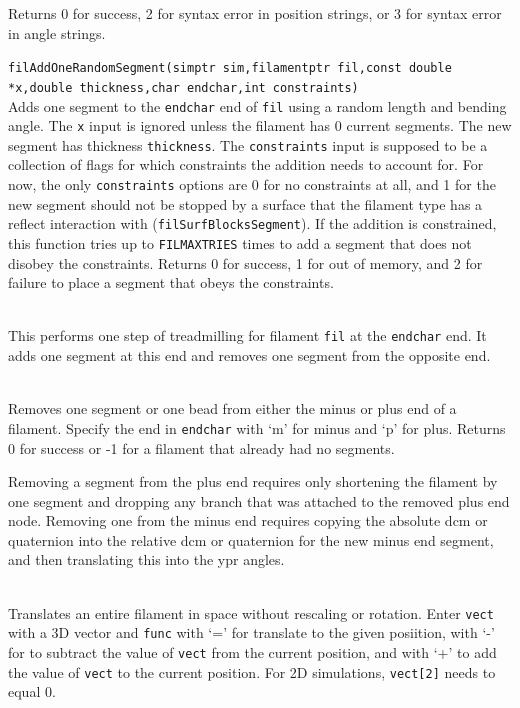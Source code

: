\documentclass {scrbook}
\newcommand {\ttt} {\texttt}
\begin{document}
\begin{description}
Returns 0 for success, 2 for syntax error in position strings, or 3 for syntax error in angle strings.

\item[\ttt{int}]
\ttt{filAddOneRandomSegment(simptr sim,filamentptr fil,const double *x,double thickness,char endchar,int constraints)}
\hfill \\
Adds one segment to the \ttt{endchar} end of \ttt{fil} using a random length and bending angle. The \ttt{x} input is ignored unless the filament has 0 current segments. The new segment has thickness \ttt{thickness}. The \ttt{constraints} input is supposed to be a collection of flags for which constraints the addition needs to account for. For now, the only \ttt{constraints} options are 0 for no constraints at all, and 1 for the new segment should not be stopped by a surface that the filament type has a reflect interaction with (\ttt{filSurfBlocksSegment}). If the addition is constrained, this function tries up to \ttt{FILMAXTRIES} times to add a segment that does not disobey the constraints. Returns 0 for success, 1 for out of memory, and 2 for failure to place a segment that obeys the constraints.

\item[\ttt{void filTreadmill(simptr sim, filamentptr fil, char endchar)}]
\hfill \\
This performs one step of treadmilling for filament \ttt{fil} at the \ttt{endchar} end. It adds one segment at this end and removes one segment from the opposite end.

\item[\ttt{int filRemoveSegment(filamentptr fil, char endchar)}]
\hfill \\
Removes one segment or one bead from either the minus or plus end of a filament. Specify the end in \ttt{endchar} with `m' for minus and `p' for plus. Returns 0 for success or -1 for a filament that already had no segments.

Removing a segment from the plus end requires only shortening the filament by one segment and dropping any branch that was attached to the removed plus end node. Removing one from the minus end requires copying the absolute dcm or quaternion into the relative dcm or quaternion for the new minus end segment, and then translating this into the ypr angles.

\item[\ttt{void filTranslate(filamentptr fil, const double *vect, char func)}]
\hfill \\
Translates an entire filament in space without rescaling or rotation. Enter \ttt{vect} with a 3D vector and \ttt{func} with `=' for translate to the given posiition, with `-' for to subtract the value of \ttt{vect} from the current position, and with `+' to add the value of \ttt{vect} to the current position. For 2D simulations, \ttt{vect[2]} needs to equal 0.


\end{description}
\end{document}
